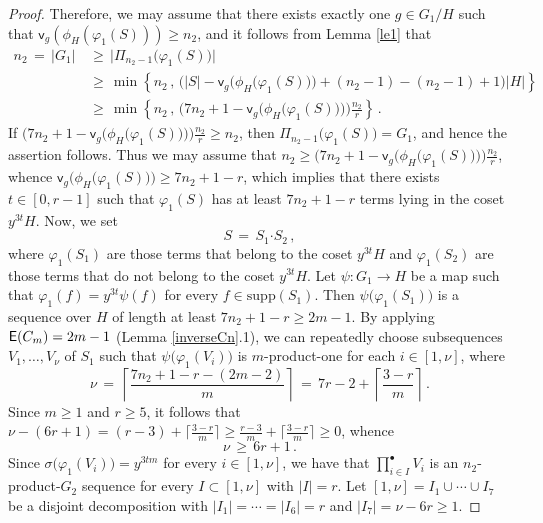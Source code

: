 \documentclass[leqno,a4paper]{amsart}
\def\E{{\sf E}}
\def\bd{{\boldsymbol{\cdot}}}
\def\supp{\text{supp}}
\theoremstyle{plain}
\theoremstyle{definition}
\numberwithin{equation}{section}
\begin{document}
\begin{proof}
        Therefore, we may assume that there exists exactly one $g\in G_1/H$ such that $\mathsf v_{g}(\phi_H(\varphi_1(S)))\ge n_2$, and it follows from Lemma \ref{le1} that
		\begin{align*}
			n_2 \, = \, |G_1| \, & \ge \, \big| \Pi_{n_2-1} \big( \varphi_1 (S) \big) \big| \\
			& \ge \, \min\left\{ n_2 \, , \, \big( |S|-\mathsf v_{g}\big( \phi_H \big( \varphi_1(S) \big) \big)+ (n_2-1) - (n_2-1)+1 \big)|H| \right\} \\
			& \ge \, \min\left\{ n_2 \, , \, \big( 7n_2 + 1 -\mathsf v_{g} \big( \phi_H \big( \varphi_1 (S) \big) \big) \big) \frac{n_2}{r} \right\} \,.
		\end{align*}
        If $\big( 7n_2 + 1 -\mathsf v_{g} \big( \phi_H \big( \varphi_1 (S) \big) \big) \big) \frac{n_2}{r} \ge n_2$, then $\Pi_{n_2-1} \big( \varphi_1 (S) \big) = G_1$, and hence the assertion follows. Thus we may assume that $n_2 \ge \big( 7n_2 + 1 -\mathsf v_{g} \big( \phi_H \big( \varphi_1 (S) \big) \big) \big) \frac{n_2}{r}$, whence $\mathsf v_{g} \big( \phi_H \big( \varphi_1 (S) \big) \big) \ge 7n_2 + 1 - r$, which implies that there exists $t \in [0, r-1]$ such that $\varphi_1 (S)$ has at least $7n_2 + 1 - r$ terms lying in the coset $y^{3t}H$.
		Now, we set
		\[
		  S \, = \, S_1 \bd S_2 \,,
		\]
		where $\varphi_1 (S_1)$ are those terms that belong to the coset $y^{3t}H$ and $\varphi_1 (S_2)$ are those terms that do not belong to the coset $y^{3t}H$. Let $\psi\colon G_1\rightarrow H$ be a map such that $\varphi_1(f)=y^{3t}\psi(f)$ for every $f \in \supp(S_1)$. Then $\psi \big( \varphi_1 (S_1) \big)$ is a sequence over $H$ of length at least $7n_2 + 1 - r \ge 2m-1$.
        By applying $\E(C_m) = 2m-1$ (Lemma \ref{inverseCn}.1), we can repeatedly choose subsequences $V_1, \ldots, V_{\nu}$ of $S_1$ such that $\psi \big( \varphi_1 (V_i) \big)$ is $m$-product-one for each $i \in [1,\nu]$, where
        \[
          \nu \, = \, \left\lceil \frac{7n_2+1-r-(2m-2)}{m} \right\rceil \, = \, 7r - 2 + \left\lceil \frac{3-r}{m} \right\rceil \,.
        \]
        Since $m \ge 1$ and $r \ge 5$, it follows that $\nu - (6r + 1) = (r-3) + \lceil \frac{3-r}{m} \rceil \ge \frac{r-3}{m} + \lceil \frac{3-r}{m} \rceil \ge 0$, whence
        \[
          \nu \, \ge \, 6r + 1\,.
        \]
		Since $\sigma \big( \varphi_1 (V_i) \big) = y^{3tm}$ for every $i \in [1, \nu]$,  we have that $\prod^{\bullet}_{i\in I}V_i$ is an $n_2$-product-$G_2$ sequence  for every $I \subset [1, \nu]$ with $|I| = r$.
		Let $[1,\nu] = I_1 \cup \cdots \cup I_7$ be a disjoint decomposition with $|I_1| = \cdots = |I_6| = r$ and $|I_7| = \nu - 6r \ge 1$.

\end{proof}
\end{document}
